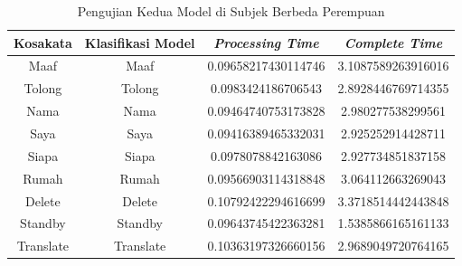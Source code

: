 \begin{longtable}{|c|c|c|c|}
  \caption{Pengujian Kedua Model di Subjek Berbeda Perempuan}
  \label{tb:prediksiperempuan2}                                   \\
  \hline
  \rowcolor[HTML]{C0C0C0}
  \textbf{Kosakata} & \textbf{Klasifikasi Model} & \textbf{\emph{Processing Time}} & \textbf{\emph{Complete Time}}\\
  \hline
  Maaf              & Maaf                        & 0.09658217430114746                           & 3.1087589263916016                                  \\
  Tolong            & Tolong                        & 0.0983424186706543                           & 2.8928446769714355                                  \\
  Nama              & Nama                        & 0.09464740753173828                           & 2.980277538299561                                  \\
  Saya              & Saya                        & 0.09416389465332031                           & 2.925252914428711                                  \\
  Siapa              & Siapa                        & 0.0978078842163086                           & 2.927734851837158                                  \\
  Rumah             & Rumah                        & 0.09566903114318848                           & 3.064112663269043                                  \\
  Delete            & Delete                        & 0.10792422294616699                           & 3.3718514442443848                                  \\
  Standby           & Standby                        & 0.09643745422363281                           & 1.5385866165161133                                  \\
  Translate         & Translate                        & 0.10363197326660156                           & 2.9689049720764165                                  \\
  \hline
\end{longtable}

